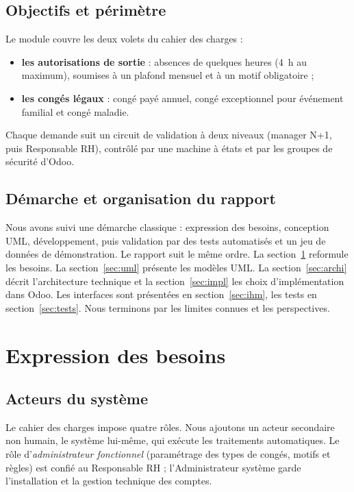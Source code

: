 \documentclass[11pt,a4paper]{article}
\begin{document}
\subsection{Objectifs et périmètre}
Le module couvre les deux volets du cahier des charges :
\begin{itemize}
  \item \textbf{les autorisations de sortie} : absences de quelques heures (4~h au maximum), soumises
        à un plafond mensuel et à un motif obligatoire ;
  \item \textbf{les congés légaux} : congé payé annuel, congé exceptionnel pour événement familial et
        congé maladie.
\end{itemize}
Chaque demande suit un circuit de validation à deux niveaux (manager N+1, puis Responsable RH),
contrôlé par une machine à états et par les groupes de sécurité d'Odoo.

\subsection{Démarche et organisation du rapport}
Nous avons suivi une démarche classique : expression des besoins, conception UML, développement,
puis validation par des tests automatisés et un jeu de données de démonstration. Le rapport suit
le même ordre. La section~\ref{sec:besoins} reformule les besoins. La section~\ref{sec:uml}
présente les modèles UML. La section~\ref{sec:archi} décrit l'architecture technique et la
section~\ref{sec:impl} les choix d'implémentation dans Odoo. Les interfaces sont présentées en
section~\ref{sec:ihm}, les tests en section~\ref{sec:tests}. Nous terminons par les limites
connues et les perspectives.

\section{Expression des besoins}\label{sec:besoins}

\subsection{Acteurs du système}
Le cahier des charges impose quatre rôles. Nous ajoutons un acteur secondaire non humain, le
système lui-même, qui exécute les traitements automatiques. Le rôle d'\emph{administrateur
fonctionnel} (paramétrage des types de congés, motifs et règles) est confié au Responsable RH ;
l'Administrateur système garde l'installation et la gestion technique des comptes.
\end{document}
